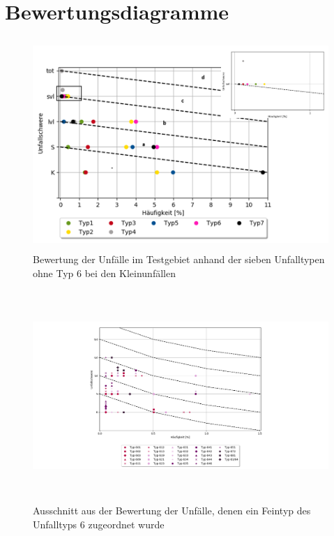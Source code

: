 
\chapter{Bewertungsdiagramme}\label{chapter:Bewertungsdiagramme}

\begin{savenotes}
	\begin{figure}[H]
		\centering
		\includegraphics[width=12cm,height=8cm]{figures/Bewertung_UTF(2)}
		\caption[Bewertung der Unfälle im Testgebiet anhand der sieben Unfalltypen ohne Typ 6 bei den Kleinunfällen]{Bewertung der Unfälle im Testgebiet anhand der sieben Unfalltypen ohne Typ 6 bei den Kleinunfällen}\label{fig:Bewertung_UTF(2)}
	\end{figure}
\end{savenotes}

\begin{savenotes}
	\begin{figure}[H]
		\centering
		\includegraphics[width=12cm,height=8cm]{figures/Bewertung_FT6(2)}
		\caption[Ausschnitt aus der Bewertung der Unfälle, denen ein Feintyp des Unfalltyps 6 zugeordnet wurde]{Ausschnitt aus der Bewertung der Unfälle, denen ein Feintyp des Unfalltyps 6 zugeordnet wurde}\label{fig:Bewertung_FT6(2)}
	\end{figure}
\end{savenotes}


